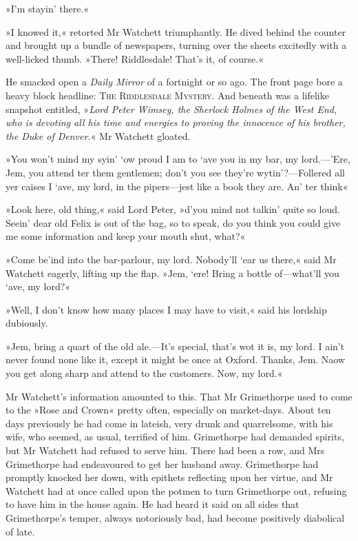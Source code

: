 »I'm stayin' there.«

»I knowed it,« retorted Mr Watchett triumphantly. He dived behind the counter and brought up a bundle of newspapers, turning over the sheets excitedly with a well-licked thumb. »There! Riddlesdale! That's it, of course.«

He smacked open a \textit{Daily Mirror} of a fortnight or so ago. The front page bore a heavy block headline: \textsc{The Riddlesdale Mystery}. And beneath was a lifelike snapshot entitled, »\textit{Lord Peter Wimsey, the Sherlock Holmes of the West End, who is devoting all his time and energies to proving the innocence of his brother, the Duke of Denver.}« Mr Watchett gloated.

»You won't mind my syin' `ow proud I am to `ave you in my bar, my lord.—'Ere, Jem, you attend ter them gentlemen; don't you see they're wytin'?—Follered all yer caises I `ave, my lord, in the pipers—jest like a book they are. An' ter think\longdash«

»Look here, old thing,« said Lord Peter, »d'you mind not talkin' quite so loud. Seein' dear old Felix is out of the bag, so to speak, do you think you could give me some information and keep your mouth shut, what?«

»Come be'ind into the bar-parlour, my lord. Nobody'll `ear us there,« said Mr Watchett eagerly, lifting up the flap. »Jem, `ere! Bring a bottle of—what'll you `ave, my lord?«

»Well, I don't know how many places I may have to visit,« said his lordship dubiously.

»Jem, bring a quart of the old ale.—It's special, that's wot it is, my lord. I ain't never found none like it, except it might be once at Oxford. Thanks, Jem. Naow you get along sharp and attend to the customers. Now, my lord.«

Mr Watchett's information amounted to this. That Mr Grimethorpe used to come to the »Rose and Crown« pretty often, especially on market-days. About ten days previously he had come in lateish, very drunk and quarrelsome, with his wife, who seemed, as usual, terrified of him. Grimethorpe had demanded spirits, but Mr Watchett had refused to serve him. There had been a row, and Mrs Grimethorpe had endeavoured to get her husband away. Grimethorpe had promptly knocked her down, with epithets reflecting upon her virtue, and Mr Watchett had at once called upon the potmen to turn Grimethorpe out, refusing to have him in the house again. He had heard it said on all sides that Grimethorpe's temper, always notoriously bad, had become positively diabolical of late.

